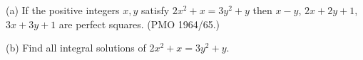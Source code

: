 (a) If the positive integers $x, y$ satisfy $2x^2 + x = 3y^2 + y$ then $x - y$, $2x + 2y + 1$, $3x + 3y + 1$ are perfect squares. (PMO 1964/65.)

(b) Find all integral solutions of $2x^2 + x = 3y^2 + y$.
